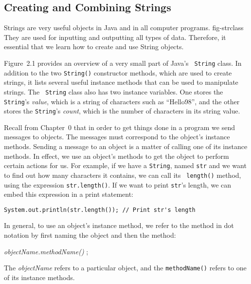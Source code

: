 \subsection{Creating and Combining Strings}

Strings are very useful objects in Java and in all computer programs.
{fig-strclass}
They are used for inputting and outputting all types of
data. Therefore, it essential that we learn how to create and use
String objects.

Figure~2.1 provides an overview of a very small part of Java's {\tt
String} class. In addition to the two {\tt String()} constructor
methods, which are used to create strings, it lists several useful
instance methods that can be used to manipulate strings. The {\tt
String} class also has two instance variables. One stores the {\tt
String}'s {\it value}, which is a string of characters such as
``Hello98'', and the other stores the {\tt String}'s {\it count},
which is the number of characters in its string value.

Recall from Chapter~0 that in order to get things done in a program we
send messages to objects. The messages must correspond to the object's
instance methods. Sending a message to an object is a matter of
calling one of its instance methods.  In effect, we use an object's
methods to get the object to perform certain actions for us. For
example, if we have a {\tt String}, named {\tt str} and we want to
find out how many characters it contains, we can call its {\tt
length()} method, using the expression {\tt str.length()}. If we
want to print {\tt str}'s length, we can embed this expression in
a print statement:

\begin{jjjlisting}
\begin{lstlisting}
System.out.println(str.length()); // Print str's length
\end{lstlisting}
\end{jjjlisting}

\noindent In general, to use an object's instance method, we refer 
to the method in dot notation by first naming the object and then the
method:

\begin{extract}
{\it objectName.methodName()} ;
\end{extract}

\noindent The {\it objectName} refers to a particular object,
and the {\tt methodName()} refers to one of its instance methods.

